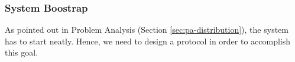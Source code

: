 



\subsubsection{System Boostrap}\label{sec:sys-boot-mw}
As pointed out in Problem Analysis (Section \ref{sec:pa-distribution}),
the system has
to start neatly. Hence, we need to design a protocol in order to accomplish
this goal.

